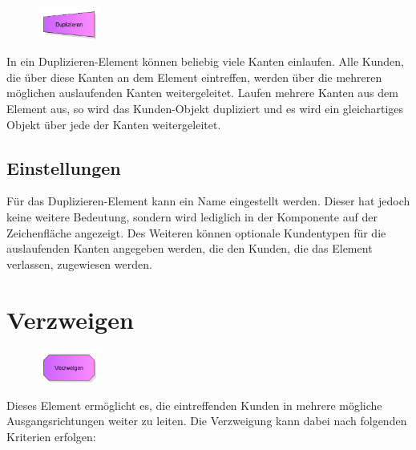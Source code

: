 \begin{figure}
\vspace{-22pt}
\includegraphics[width=2cm]{imageModelElementDuplicate.png}
\vspace{-22pt}
\end{figure}

In ein Duplizieren-Element können beliebig viele Kanten einlaufen. Alle Kunden, die über diese Kanten an dem Element eintreffen,
werden über die mehreren möglichen auslaufenden Kanten weitergeleitet. Laufen mehrere Kanten aus dem Element aus, so wird das
Kunden-Objekt dupliziert und es wird ein gleichartiges Objekt über jede der Kanten weitergeleitet.

\subsection*{Einstellungen}

Für das Duplizieren-Element kann ein Name eingestellt werden. Dieser hat jedoch keine weitere Bedeutung, sondern wird lediglich
in der Komponente auf der Zeichenfläche angezeigt. Des Weiteren können optionale Kundentypen für die auslaufenden Kanten angegeben
werden, die den Kunden, die das Element verlassen, zugewiesen werden.


\section{Verzweigen}
\label{ref:ModelElementDecide}

\begin{figure}
\vspace{-22pt}
\includegraphics[width=2cm]{imageModelElementDecide.png}
\vspace{-22pt}
\end{figure}

Dieses Element ermöglicht es, die eintreffenden Kunden in mehrere mögliche Ausgangsrichtungen weiter zu leiten.
Die Verzweigung kann dabei nach folgenden Kriterien erfolgen:

